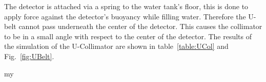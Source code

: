 The detector is attached via a spring to the water tank's floor, this is done to apply force against the detector's buoyancy while filling water. Therefore the U-belt cannot pass underneath the center of the detector. This causes the collimator to be in a small angle with respect to the center of the detector.
The results of the simulation of the U-Collimator are shown in table~\ref{table:UCol} and Fig.~\ref{fig:UBelt}.



  

% 
%


\begin{table}
\begin{center}
my\caption[Result of GEANT4 simulation for a 10X10X10cm collimator]{Result of GEANT4 simulation for a 10X10X10cm collimator with an aperture of $45 \deg$, a good event is an event that scattered only once in the FV with energy deposition of 2-15 keVee}
\label{table:UCol}
\end{center}
\end{table}


